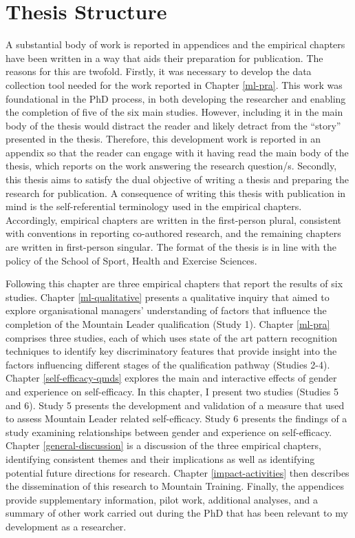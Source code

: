 \documentclass[
  12pt,
  a4paper,
]{book}
\begin{document}
\hypertarget{thesis-structure}{%
\section{Thesis Structure}\label{thesis-structure}}

A substantial body of work is reported in appendices and the empirical chapters have been written in a way that aids their preparation for publication. The reasons for this are twofold. Firstly, it was necessary to develop the data collection tool needed for the work reported in Chapter \ref{ml-pra}. This work was foundational in the PhD process, in both developing the researcher and enabling the completion of five of the six main studies. However, including it in the main body of the thesis would distract the reader and likely detract from the ``story'' presented in the thesis. Therefore, this development work is reported in an appendix so that the reader can engage with it having read the main body of the thesis, which reports on the work answering the research question/s. Secondly, this thesis aims to satisfy the dual objective of writing a thesis and preparing the research for publication. A consequence of writing this thesis with publication in mind is the self-referential terminology used in the empirical chapters. Accordingly, empirical chapters are written in the first-person plural, consistent with conventions in reporting co-authored research, and the remaining chapters are written in first-person singular. The format of the thesis is in line with the policy of the School of Sport, Health and Exercise Sciences.

Following this chapter are three empirical chapters that report the results of six studies.
Chapter \ref{ml-qualitative} presents a qualitative inquiry that aimed to explore organisational managers' understanding of factors that influence the completion of the Mountain Leader qualification (Study 1).
Chapter \ref{ml-pra} comprises three studies, each of which uses state of the art pattern recognition techniques to identify key discriminatory features that provide insight into the factors influencing different stages of the qualification pathway (Studies 2-4).
Chapter \ref{self-efficacy-qmds} explores the main and interactive effects of gender and experience on self-efficacy. In this chapter, I present two studies (Studies 5 and 6). Study 5 presents the development and validation of a measure that used to assess Mountain Leader related self-efficacy. Study 6 presents the findings of a study examining relationships between gender and experience on self-efficacy.
Chapter \ref{general-discussion} is a discussion of the three empirical chapters, identifying consistent themes and their implications as well as identifying potential future directions for research.
Chapter \ref{impact-activities} then describes the dissemination of this research to Mountain Training.
Finally, the appendices provide supplementary information, pilot work, additional analyses, and a summary of other work carried out during the PhD that has been relevant to my development as a researcher.
\end{document}
